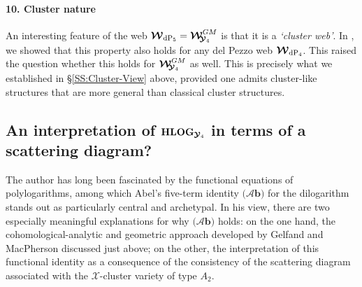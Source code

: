 \documentclass[11pt]{amsart}
\begin{document}
\paragraph{\bf 10. Cluster nature}
An interesting feature of the web $\boldsymbol{\mathcal W}_{ {\rm dP}_5}=
\boldsymbol{\mathcal W}_{\hspace{-0.1cm} \boldsymbol{\mathcal Y}_4}^{GM}$ is that it is a \emph{`cluster web'}. In \cite[\S4.7]{PirioAFST}, we showed that this property also holds for any del Pezzo web $\boldsymbol{\mathcal W}_{ {\rm dP}_4}$.  
This raised the question whether this holds  for $\boldsymbol{\mathcal W}_{\hspace{-0.1cm} \boldsymbol{\mathcal Y}_4}^{GM}$ as well. This is precisely what we established in \S\ref{SS:Cluster-View} above, provided one admits cluster-like structures that are more general than classical cluster structures.



\subsection{\bf An interpretation of ${\bf HLOG}_{\boldsymbol{\mathcal Y}_4}$ in terms of a scattering diagram?}
\label{SS:HLOG-Yr-in-terms-scattering-diagram}
The author has long been fascinated by the functional equations of polylogarithms, among which Abel's five-term identity $\big(\boldsymbol{{\mathcal A}b}\big)$ for the dilogarithm stands out as particularly central and archetypal. In his view, there are two especially meaningful explanations for why $\big(\boldsymbol{{\mathcal A}b}\big)$ holds: on the one hand, the cohomological-analytic and geometric approach developed by Gelfand and MacPherson discussed just above; on the other, the interpretation of this functional identity as a consequence of the consistency of the scattering diagram associated with the $\mathcal X$-cluster variety of type $A_2$.
\end{document}
